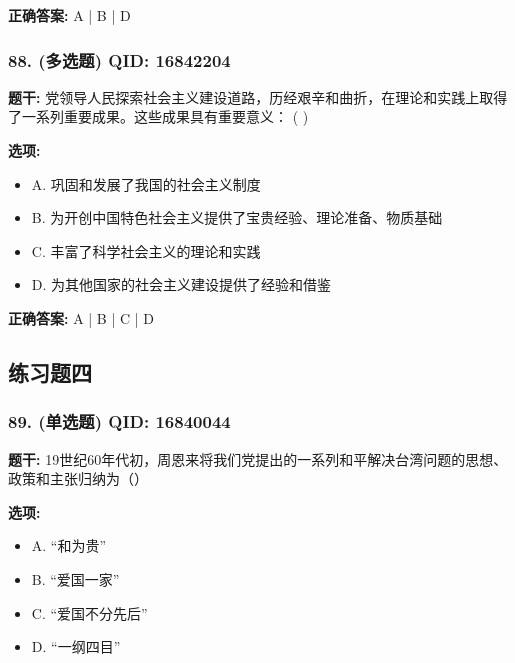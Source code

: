 \documentclass[12pt,UTF8]{ctexart}
\begin{document}
\textbf{正确答案:}
A | B | D

\vspace{0.3em}\hrulefill\vspace{0.7em}

\subsubsection*{88. (多选题) \small QID: 16842204}

\textbf{题干:}
党领导人民探索社会主义建设道路，历经艰辛和曲折，在理论和实践上取得了一系列重要成果。这些成果具有重要意义： ( )

\textbf{选项:}
\begin{itemize}[leftmargin=*]

  \item A. 巩固和发展了我国的社会主义制度

  \item B. 为开创中国特色社会主义提供了宝贵经验、理论准备、物质基础

  \item C. 丰富了科学社会主义的理论和实践

  \item D. 为其他国家的社会主义建设提供了经验和借鉴

\end{itemize}

\textbf{正确答案:}
A | B | C | D

\vspace{0.3em}\hrulefill\vspace{0.7em}

\subsection*{练习题四}

\subsubsection*{89. (单选题) \small QID: 16840044}

\textbf{题干:}
19世纪60年代初，周恩来将我们党提出的一系列和平解决台湾问题的思想、政策和主张归纳为（）

\textbf{选项:}
\begin{itemize}[leftmargin=*]

  \item A. “和为贵”

  \item B. “爱国一家”

  \item C. “爱国不分先后”

  \item D. “一纲四目”

\end{itemize}
\end{document}
